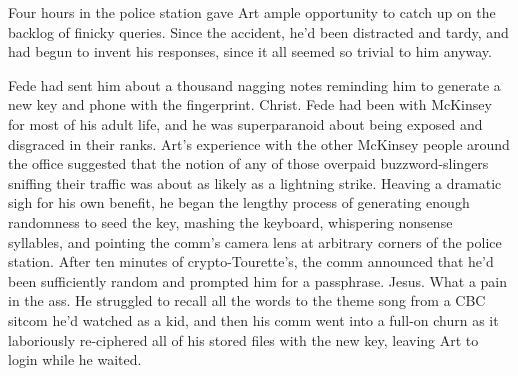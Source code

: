 Four hours in the police station gave Art ample opportunity to
catch up on the backlog of finicky queries. Since the accident,
he’d been distracted and tardy, and had begun to invent his
responses, since it all seemed so trivial to him anyway.

Fede had sent him about a thousand nagging notes reminding him to
generate a new key and phone with the fingerprint. Christ. Fede had
been with McKinsey for most of his adult life, and he was
superparanoid about being exposed and disgraced in their ranks.
Art’s experience with the other McKinsey people around the office
suggested that the notion of any of those overpaid
buzzword-slingers sniffing their traffic was about as likely as a
lightning strike. Heaving a dramatic sigh for his own benefit, he
began the lengthy process of generating enough randomness to seed
the key, mashing the keyboard, whispering nonsense syllables, and
pointing the comm’s camera lens at arbitrary corners of the police
station. After ten minutes of crypto-Tourette’s, the comm announced
that he’d been sufficiently random and prompted him for a
passphrase. Jesus. What a pain in the ass. He struggled to recall
all the words to the theme song from a CBC sitcom he’d watched as a
kid, and then his comm went into a full-on churn as it laboriously
re-ciphered all of his stored files with the new key, leaving Art
to login while he waited.

